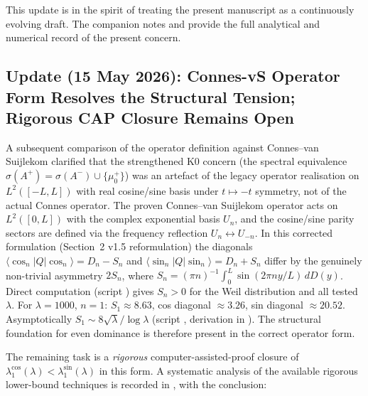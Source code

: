 \documentclass[11pt,a4paper]{article}
\theoremstyle{remark}
\theoremstyle{plain}
\begin{document}
This update is in the spirit of treating the present manuscript as a
continuously evolving draft. The companion notes
 and
 provide the full analytical
and numerical record of the present concern.

\subsection{Update (15 May 2026): Connes-vS Operator Form Resolves the
            Structural Tension; Rigorous CAP Closure Remains Open}
\label{sec:k0-cvs-resolution}

A subsequent comparison of the operator definition against
Connes--van Suijlekom \cite{ConnesvS2025} clarified that the strengthened
K0 concern (the spectral equivalence
$\sigma(A^+) = \sigma(A^-) \cup \{\mu^+_0\}$) was an artefact of the
legacy operator realisation on $L^2([-L,L])$ with real cosine/sine
basis under $t\mapsto -t$ symmetry, not of the actual Connes operator.
The proven Connes--van Suijlekom operator acts on $L^2([0,L])$ with
the complex exponential basis $U_n$, and the cosine/sine parity
sectors are defined via the frequency reflection
$U_n\leftrightarrow U_{-n}$.  In this corrected formulation
(Section~2 v1.5 reformulation) the diagonals
$\langle\cos_n|Q|\cos_n\rangle = D_n - S_n$ and
$\langle\sin_n|Q|\sin_n\rangle = D_n + S_n$ differ by the genuinely
non-trivial asymmetry $2S_n$, where
$S_n = (\pi n)^{-1}\int_0^L\sin(2\pi n y/L)\,dD(y)$.  Direct
computation (script )
gives $S_n > 0$ for the Weil distribution and all tested $\lambda$.
For $\lambda=1000$, $n=1$: $S_1\approx 8.63$, cos diagonal
$\approx 3.26$, sin diagonal $\approx 20.52$.  Asymptotically
$S_1\sim 8\sqrt\lambda/\log\lambda$ (script
, derivation in
). The structural foundation
for even dominance is therefore present in the correct operator form.

The remaining task is a \emph{rigorous} computer-assisted-proof closure
of $\lambda_1^{\cos}(\lambda) < \lambda_1^{\sin}(\lambda)$ in this
form.  A systematic analysis of the available rigorous lower-bound
techniques is recorded in
, with the conclusion:
\end{document}
